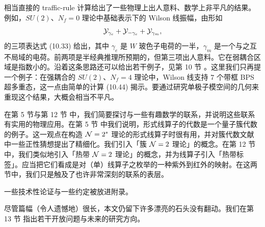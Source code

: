 相当直接的 \mbox{traffic-rule} 计算给出了一些物理上出人意料、数学上非平凡的结果。例如，$SU(2)$、$N_f=0$ 理论中基础表示下的 Wilson 线振幅，由形如
\begin{equation} \label{eq:nf0-wilson}
\mathcal{Y}_{\gamma_e} + \mathcal{Y}_{-\gamma_e} + \mathcal{Y}_{\gamma_m},
\end{equation}
的三项表达式 (10.33)%
给出，其中 $\gamma_e$ 是 $W$ 玻色子电荷的一半，$\gamma_m$ 是一个与之互不局域的电荷。前两项是半经典推理所预期的，但第三项出人意料。它在弱耦合区域是指数小的。沿着这条思路还可以给出若干例子，见第 10 节%
。这里我们只再提一个例子：在强耦合的 $SU(2)$、$N_f=4$ 理论中，Wilson 线支持 $7$ 个带框 BPS 超多重态，这一点由简单的计算 (10.44)%
揭示。要通过研究单极子模空间的几何来重现这个结果，大概会相当不平凡。

在第 5 节与第 12 节%
中，我们简要探讨与一些有趣数学的联系，并说明这些联系有实用的物理应用。在第 5 节%
中我们说明，形式线算子的代数是一个量子簇代数的例子。这一观点在构造 $\mathcal{N}=2^*$ 理论的形式线算子时很有用，并对簇代数文献中一些正性猜想提出了精细化。我们引入「簇 $\mathcal{N}=2$ 理论」的概念。在第 12 节%
中，我们类似地引入「热带 $\mathcal{N}=2$ 理论」的概念，并为线算子引入「热带标签」。应当把它们看成是对（单）线算子之枚举的一种紫外到红外的映射。在这两节中，我们只是触及了也许非常深刻的联系的表层。

一些技术性论证与一些约定被放进附录。

尽管篇幅（令人遗憾地）很长，本文仍留下许多漂亮的石头没有翻动。我们在第 13 节%
指出若干开放问题与未来的研究方向。
